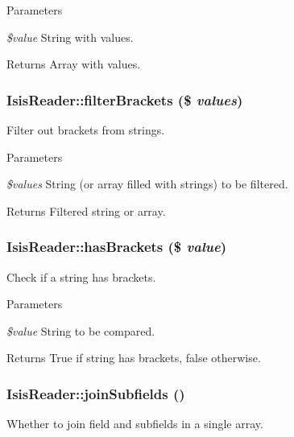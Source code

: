 \begin{DoxyParams}{Parameters}
\item[{\em \$value}]String with values.\end{DoxyParams}
\begin{DoxyReturn}{Returns}
Array with values. 
\end{DoxyReturn}
\hypertarget{classIsisReader_aa6099ed6bd276b32bd7bba184f144529}{
\subsubsection[{filterBrackets}]{\setlength{\rightskip}{0pt plus 5cm}IsisReader::filterBrackets (\$ {\em values})}}
\label{classIsisReader_aa6099ed6bd276b32bd7bba184f144529}
Filter out brackets from strings.


\begin{DoxyParams}{Parameters}
\item[{\em \$values}]String (or array filled with strings) to be filtered.\end{DoxyParams}
\begin{DoxyReturn}{Returns}
Filtered string or array. 
\end{DoxyReturn}
\hypertarget{classIsisReader_a109a6ef49b2190bfbcee796dae954baf}{
\subsubsection[{hasBrackets}]{\setlength{\rightskip}{0pt plus 5cm}IsisReader::hasBrackets (\$ {\em value})}}
\label{classIsisReader_a109a6ef49b2190bfbcee796dae954baf}
Check if a string has brackets.


\begin{DoxyParams}{Parameters}
\item[{\em \$value}]String to be compared.\end{DoxyParams}
\begin{DoxyReturn}{Returns}
True if string has brackets, false otherwise. 
\end{DoxyReturn}
\hypertarget{classIsisReader_ae65e172e3b5c9ac3c8a5e1352ba80904}{
\subsubsection[{joinSubfields}]{\setlength{\rightskip}{0pt plus 5cm}IsisReader::joinSubfields ()}}
\label{classIsisReader_ae65e172e3b5c9ac3c8a5e1352ba80904}
Whether to join field and subfields in a single array.

